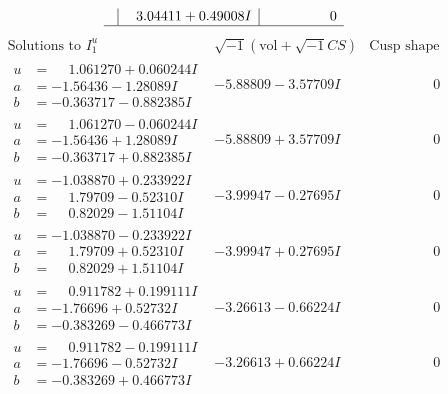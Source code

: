 \documentclass[1p]{elsarticle_modified}
\theoremstyle{definition}
\newcommand{\I}{\sqrt{-1}}
\begin{document}
$$\begin{array}{c|c|c}
 & \phantom{-}3.04411 + 0.49008 I & \phantom{-0.000000 } 0\\
 \hline 
 \end{array}$$\newpage$$\begin{array}{c|c|c}  
\text{Solutions to }I^u_{1}& \I (\text{vol} + \sqrt{-1}CS) & \text{Cusp shape}\\
 \hline 
\begin{aligned}
u &= \phantom{-}1.061270 + 0.060244 I \\
a &= -1.56436 - 1.28089 I \\
b &= -0.363717 - 0.882385 I\end{aligned}
 & -5.88809 - 3.57709 I & \phantom{-0.000000 } 0 \\ \hline\begin{aligned}
u &= \phantom{-}1.061270 - 0.060244 I \\
a &= -1.56436 + 1.28089 I \\
b &= -0.363717 + 0.882385 I\end{aligned}
 & -5.88809 + 3.57709 I & \phantom{-0.000000 } 0 \\ \hline\begin{aligned}
u &= -1.038870 + 0.233922 I \\
a &= \phantom{-}1.79709 - 0.52310 I \\
b &= \phantom{-}0.82029 - 1.51104 I\end{aligned}
 & -3.99947 - 0.27695 I & \phantom{-0.000000 } 0 \\ \hline\begin{aligned}
u &= -1.038870 - 0.233922 I \\
a &= \phantom{-}1.79709 + 0.52310 I \\
b &= \phantom{-}0.82029 + 1.51104 I\end{aligned}
 & -3.99947 + 0.27695 I & \phantom{-0.000000 } 0 \\ \hline\begin{aligned}
u &= \phantom{-}0.911782 + 0.199111 I \\
a &= -1.76696 + 0.52732 I \\
b &= -0.383269 - 0.466773 I\end{aligned}
 & -3.26613 - 0.66224 I & \phantom{-0.000000 } 0 \\ \hline\begin{aligned}
u &= \phantom{-}0.911782 - 0.199111 I \\
a &= -1.76696 - 0.52732 I \\
b &= -0.383269 + 0.466773 I\end{aligned}
 & -3.26613 + 0.66224 I & \phantom{-0.000000 } 0 \\ \hline\begin{aligned}

\end{aligned}
\end{array}$$
\end{document}
